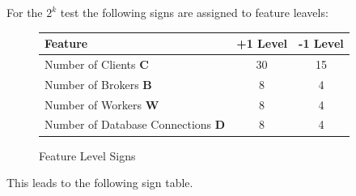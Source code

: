 \documentclass[milestone1.tex]{subfiles}
\begin{document}
For the $2^k$ test the following signs are assigned to feature leavels:\\


\begin{figure}[H]
	\begin{center}
\begin{tabular}{|l|c|c|}
\hline 
Feature & +1 Level & -1 Level \\ 
\hline 
Number of Clients \textbf{C} & 30 & 15 \\ 
\hline 
Number of Brokers \textbf{B} & 8 & 4 \\ 
\hline 
Number of Workers \textbf{W} & 8 & 4 \\ 
\hline 
Number of Database Connections \textbf{D} & 8 & 4 \\ 
\hline 
\end{tabular} 
\end{center}
\caption{Feature Level Signs}
\end{figure}

This leads to the following sign table.
\end{document}
